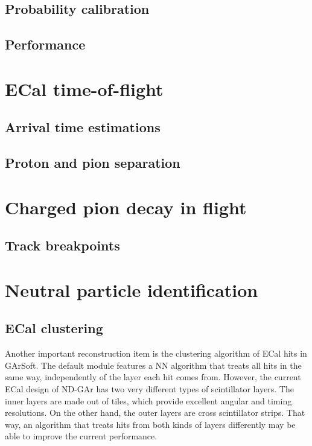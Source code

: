 \subsection{Probability calibration}

\subsection{Performance}

\section{ECal time-of-flight}

\subsection{Arrival time estimations}

\subsection{Proton and pion separation}

\section{Charged pion decay in flight}

\subsection{Track breakpoints}

\section{Neutral particle identification}

\subsection{ECal clustering}

Another important reconstruction item is the clustering algorithm of ECal hits in GArSoft. The default module features a NN algorithm that treats all hits in the same way, independently of the layer each hit comes from. However, the current ECal design of ND-GAr has two very different types of scintillator layers. The inner layers are made out of tiles, which provide excellent angular and timing resolutions. On the other hand, the outer layers are cross scintillator strips. That way, an algorithm that treats hits from both kinds of layers differently may be able to improve the current performance.

